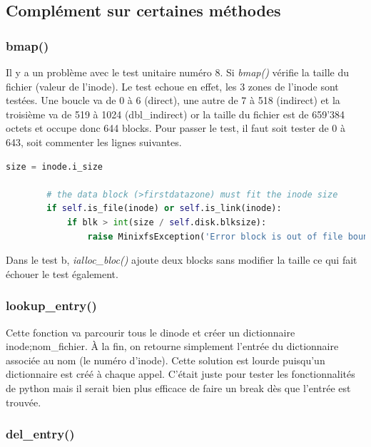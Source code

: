 \documentclass[a4paper,12pt]{article}
\begin{document}
\subsection{Complément sur certaines méthodes}

\subsubsection*{bmap()}

Il y a un problème avec le test unitaire numéro 8. Si \emph{bmap()} vérifie la taille du fichier (valeur de l'inode). Le test echoue en effet, les 3 zones de l'inode sont testées. Une boucle va de 0 à 6 (direct), une autre de 7 à 518 (indirect) et la troisième va de 519 à 1024 (dbl\_indirect) or la taille du fichier est de 659'384 octets et occupe donc 644 blocks. Pour passer le test, il faut soit tester de 0 à 643, soit commenter les lignes suivantes.\\


\begin{lstlisting}[language=python, caption=test inode\_size in bmap]
        size = inode.i_size

        # the data block (>firstdatazone) must fit the inode size
        if self.is_file(inode) or self.is_link(inode):
            if blk > int(size / self.disk.blksize):
                raise MinixfsException('Error block is out of file boundary')
\end{lstlisting}

Dans le test b, \emph{ialloc\_bloc()} ajoute deux blocks sans modifier la taille ce qui fait échouer le test également.\\

\subsubsection*{lookup\_entry()}

Cette fonction va parcourir tous le dinode et créer un dictionnaire inode;nom\_fichier. À la fin, on retourne simplement l'entrée du dictionnaire associée au nom (le numéro d'inode). Cette solution est lourde puisqu'un dictionnaire est créé à chaque appel. C'était juste pour tester les fonctionnalités de python mais il serait bien plus efficace de faire un break dès que l'entrée est trouvée.\\


\subsubsection*{del\_entry()}
\end{document}
